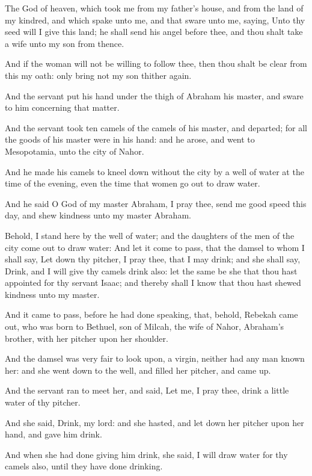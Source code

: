 \verse The \LORD God of heaven, which took me from my father's house, and from the land of my kindred, and which spake unto me, and that sware unto me, saying, Unto thy seed will I give this land; he shall send his angel before thee, and thou shalt take a wife unto my son from thence.

\verse And if the woman will not be willing to follow thee, then thou shalt be clear from this my oath: only bring not my son thither again.

\verse And the servant put his hand under the thigh of Abraham his master, and sware to him concerning that matter.

\verse And the servant took ten camels of the camels of his master, and departed; for all the goods of his master were in his hand: and he arose, and went to Mesopotamia, unto the city of Nahor.

\verse And he made his camels to kneel down without the city by a well of water at the time of the evening, even the time that women go out to draw water.

\verse And he said O \LORD God of my master Abraham, I pray thee, send me good speed this day, and shew kindness unto my master Abraham.

\verse Behold, I stand here by the well of water; and the daughters of the men of the city come out to draw water: \verse And let it come to pass, that the damsel to whom I shall say, Let down thy pitcher, I pray thee, that I may drink; and she shall say, Drink, and I will give thy camels drink also: let the same be she that thou hast appointed for thy servant Isaac; and thereby shall I know that thou hast shewed kindness unto my master.

\verse And it came to pass, before he had done speaking, that, behold, Rebekah came out, who was born to Bethuel, son of Milcah, the wife of Nahor, Abraham's brother, with her pitcher upon her shoulder.

\verse And the damsel was very fair to look upon, a virgin, neither had any man known her: and she went down to the well, and filled her pitcher, and came up.

\verse And the servant ran to meet her, and said, Let me, I pray thee, drink a little water of thy pitcher.

\verse And she said, Drink, my lord: and she hasted, and let down her pitcher upon her hand, and gave him drink.

\verse And when she had done giving him drink, she said, I will draw water for thy camels also, until they have done drinking.

